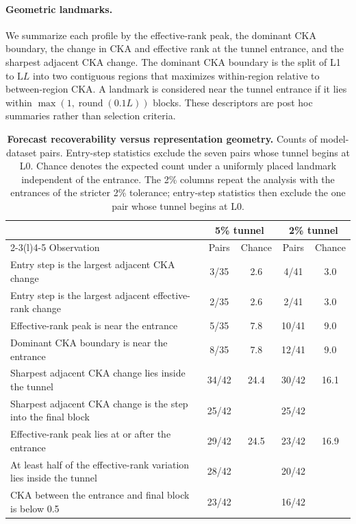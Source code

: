 \documentclass{article} %
\begin{document}
\paragraph{Geometric landmarks.}
We summarize each profile by the effective-rank peak, the dominant CKA boundary, the change in
CKA and effective rank at the tunnel entrance, and the sharpest adjacent CKA change. The dominant
CKA boundary is the split of L1 to $\mathrm{L}L$ into two contiguous regions that maximizes
within-region relative to between-region CKA. A landmark is considered near the tunnel entrance
if it lies within $\max(1,\operatorname{round}(0.1L))$ blocks. These descriptors are post hoc
summaries rather than selection criteria.

\begin{table}[t]
  \centering
  \caption{\textbf{Forecast recoverability versus representation geometry.} Counts of
  model-dataset pairs. Entry-step statistics exclude the seven pairs whose tunnel begins at L0.
  Chance denotes the expected count under a uniformly placed landmark independent of the entrance.
  The 2\% columns repeat the analysis with the entrances of the stricter 2\% tolerance; entry-step
  statistics then exclude the one pair whose tunnel begins at L0.}
  \vspace{4pt}
  \label{tab:geometry_summary}
  \small
  \setlength{\tabcolsep}{5pt}
  \begin{tabular}{@{}lcccc@{}}
  \toprule
  & \multicolumn{2}{c}{5\% tunnel} & \multicolumn{2}{c}{2\% tunnel} \\
  \cmidrule(lr){2-3}\cmidrule(l){4-5}
  Observation & Pairs & Chance & Pairs & Chance \\
  \midrule
  Entry step is the largest adjacent CKA change & 3/35 & 2.6 & 4/41 & 3.0 \\
  Entry step is the largest adjacent effective-rank change & 2/35 & 2.6 & 2/41 & 3.0 \\
  Effective-rank peak is near the entrance & 5/35 & 7.8 & 10/41 & 9.0 \\
  Dominant CKA boundary is near the entrance & 8/35 & 7.8 & 12/41 & 9.0 \\
  \midrule
  Sharpest adjacent CKA change lies inside the tunnel & 34/42 & 24.4 & 30/42 & 16.1 \\
  Sharpest adjacent CKA change is the step into the final block & 25/42 & & 25/42 & \\
  Effective-rank peak lies at or after the entrance & 29/42 & 24.5 & 23/42 & 16.9 \\
  At least half of the effective-rank variation lies inside the tunnel & 28/42 & & 20/42 & \\
  CKA between the entrance and final block is below 0.5 & 23/42 & & 16/42 & \\
  \bottomrule
  \end{tabular}
\end{table}
\end{document}

